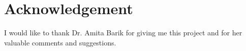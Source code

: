 \documentclass[../main.tex]{subfiles}
\begin{document}
\section{Acknowledgement}
I would like to thank  Dr. Amita Barik for giving me this project and for her valuable comments and suggestions.
\end{document}
